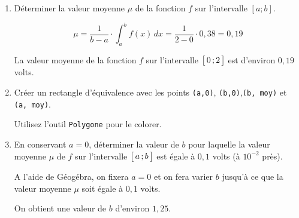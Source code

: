 \documentclass[11pt, a4paper]{report}
\begin{document}
\begin{enumerate}[resume]
    \item Déterminer la valeur moyenne $\mu$ de la fonction $f$ sur l'intervalle $[a ; b]$. 
    \begin{blocvisible}[height=3]
        \[\mu = \frac{1}{b-a} \cdot\int_a^b f(x) \, dx = \frac{1}{2-0} \cdot 0,38 = 0,19\]

        La valeur moyenne de la fonction $f$ sur l'intervalle $\bigl[ \, 0 \, ; 2 \,\bigl]$ est d'environ $0,19$ volts.
    \end{blocvisible}
    
    \item Créer un rectangle d'équivalence avec les points \verb|(a,0)|, \verb|(b,0)|,\verb|(b, moy)| et \verb|(a, moy)|. 
    
    Utilisez l'outil \verb|Polygone| pour le colorer. 

    \item En conservant $a=0$, déterminer la valeur de $b$ pour laquelle la valeur moyenne $\mu$ de $f$ sur l'intervalle $\bigl[ \, a \, ; b \,\bigl]$ est égale à $0,1$ volts (à $10^{-2}$ près). 
    \begin{blocvisible}[height=3]
        A l'aide de Géogébra, on fixera $a=0$ et on fera varier $b$ jusqu'à ce que la valeur moyenne $\mu$ soit égale à $0,1$ volts.

        On obtient une valeur de $b$ d'environ $1,25$.
    \end{blocvisible}
\end{enumerate}
\end{document}
